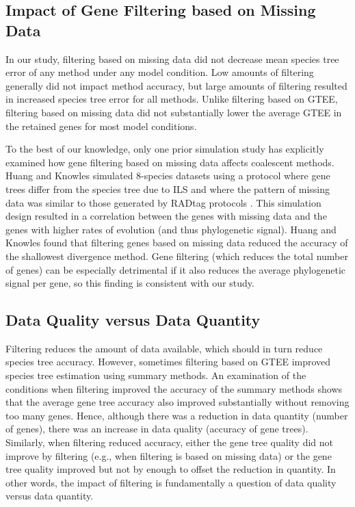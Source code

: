 \subsection{Impact of Gene Filtering based on Missing Data}
In our study, filtering based on missing data did not decrease mean species tree error of any method under any model condition.
Low amounts of filtering generally did not impact method accuracy, but large amounts of filtering resulted in increased species tree error for all methods.
Unlike filtering based on GTEE, filtering based on missing data did not substantially lower the average GTEE in the retained genes for most model conditions.

To the best of our knowledge, only one prior simulation study \cite{huang2016unforeseen} has explicitly examined how gene filtering based on missing data affects coalescent methods. Huang and Knowles \cite{huang2016unforeseen} simulated 8-species datasets using a protocol where gene trees differ from the species tree due to ILS and where the pattern of missing data was similar to those generated by RADtag protocols \cite{baird2008rapid}.
This simulation design resulted in a correlation between the genes with missing data and the genes with higher rates of evolution (and thus phylogenetic signal).
Huang and Knowles \cite{huang2016unforeseen} found that filtering genes based on missing data reduced the accuracy of the shallowest divergence method.
Gene filtering (which reduces the total number of genes) can be especially detrimental if it also reduces the average phylogenetic signal per gene, so this finding is consistent with our study.

\subsection{Data Quality versus Data Quantity}
Filtering reduces the amount of data available, which should in turn reduce species tree accuracy. 
However, sometimes filtering based on GTEE improved species tree estimation using summary methods. 
An examination of the conditions when filtering improved the accuracy of the summary methods shows that the average gene tree accuracy also improved substantially without removing too many genes. 
Hence, although there was a reduction in data quantity (number of genes), there was an increase in data quality (accuracy of gene trees). 
Similarly, when filtering reduced accuracy, either the gene tree quality did not improve by filtering (e.g., when filtering is based on missing data) or the gene tree quality improved but not by enough to offset the reduction in quantity. 
In other words, the impact of filtering is fundamentally a question of data quality versus data quantity.

